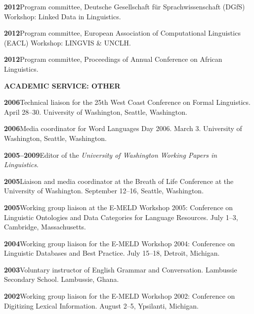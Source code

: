\documentclass[11pt]{article}
\newcommand{\hangpara}{
 \setlength{\parindent}{0in} %
 \hangindent=0.42in %
}
\begin{document}
\vskip 6pt
\hangpara
{\bf 2012}\hspace{1ex}Program committee, Deutsche Gesellschaft f{\"u}r Sprachwissenschaft (DGfS) Workshop: Linked Data in Linguistics.

\vskip 6pt
\hangpara
{\bf 2012}\hspace{1ex}Program committee, European Association of Computational Linguistics (EACL) Workshop: LINGVIS \& UNCLH.

\vskip 6pt
\hangpara
{\bf 2012}\hspace{1ex}Program committee, Proceedings of Annual Conference on African Linguistics.


\vskip 20pt
\begin{flushleft}
{\bf ACADEMIC SERVICE: OTHER}
\end{flushleft}

\hangpara
{\bf 2006}\hspace{1ex}Technical liaison for the 25th West Coast Conference on Formal Linguistics. April 28--30. University of Washington, Seattle, Washington.

\vskip 6pt
\hangpara
{\bf 2006}\hspace{1ex}Media coordinator for Word Languages Day 2006. March 3. University of Washington, Seattle, Washington.	

\vskip 6pt
\hangpara
{\bf 2005--2009}\hspace{1ex}Editor of the \textit{University of Washington Working Papers in Linguistics}.

\vskip 6pt
\hangpara
{\bf 2005}\hspace{1ex}Liaison and media coordinator at the Breath of Life Conference at the University of Washington. September 12--16, Seattle, Washington.

\vskip 6pt
\hangpara
{\bf 2005}\hspace{1ex}Working group liaison at the E-MELD Workshop 2005: Conference on Linguistic Ontologies and Data Categories for Language Resources. July 1--3, Cambridge, Massachusetts.

\vskip 6pt
\hangpara
{\bf 2004}\hspace{1ex}Working group liaison for the E-MELD Workshop 2004: Conference on Linguistic Databases and Best Practice. July 15--18, Detroit, Michigan.

\vskip 6pt
\hangpara
{\bf 2003}\hspace{1ex}Voluntary instructor of English Grammar and Conversation. Lambussie Secondary School. Lambussie, Ghana.

\vskip 6pt
\hangpara
{\bf 2002}\hspace{1ex}Working group liaison for the E-MELD Workshop 2002: Conference on Digitizing Lexical Information. August 2--5, Ypsilanti, Michigan.
\end{document}
